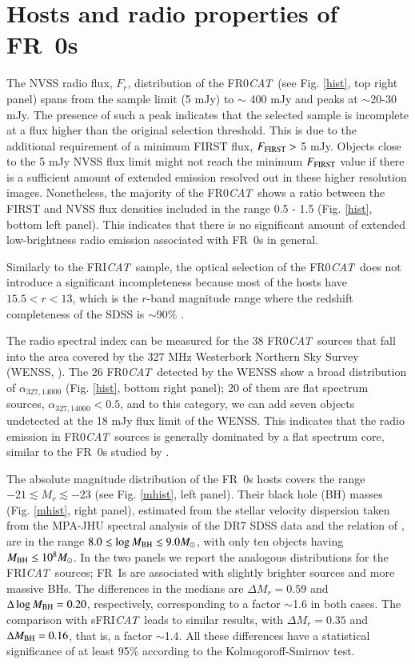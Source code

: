 \documentclass[traditabstract]{aa}
\newcommand{\FR}{FRI{\sl{CAT}}}\newcommand{\FRII}{FRII{\sl{CAT}}}
\newcommand{\FRo}{FR0{\sl{CAT}}}
\newcommand{\sFR}{sFRI{\sl{CAT}}}
\begin{document}
\section{Hosts and radio properties of FR~0s}
\label{hosts}

The NVSS radio flux, $F_r$, distribution of the \FRo\ (see
  Fig. \ref{hist}, top right panel) spans from the sample limit (5 mJy) to
  $\sim$ 400 mJy and peaks at $\sim$20-30 mJy. The presence of such a peak
  indicates that the selected sample is incomplete at a flux higher than the
  original selection threshold. This is due to the additional requirement of a
  minimum FIRST flux, $F_{\rm FIRST} >$ 5 mJy. Objects close to the 5 mJy NVSS
  flux limit might not reach the minimum $F_{\rm FIRST}$ value if there is a
  sufficient amount of extended emission resolved out in these higher
  resolution images. Nonetheless, the majority of the \FRo\ shows a ratio
between the FIRST and NVSS flux densities included in the range 0.5 - 1.5
(Fig. \ref{hist}, bottom left panel). This indicates that
  there is no significant amount of extended low-brightness radio emission
  associated with FR~0s in general.


Similarly to the \FR\ sample, the optical selection of the \FRo\ does
not introduce a significant incompleteness because most of the hosts
have $15.5 < r < 13$, which is the $r$-band magnitude range where the redshift
completeness of the SDSS is $\sim$90\% \citep{montero09}.

The radio spectral index can be measured for the 38 \FRo\ sources that
fall into the area covered by the 327 MHz Westerbork Northern Sky
Survey (WENSS, \citealt{rengelink97}). The 26 \FRo\ detected by the
WENSS show a broad distribution of $\alpha_{327,14000}$
(Fig. \ref{hist}, bottom right panel); 20 of them are flat spectrum
sources, $\alpha_{327,14000} < 0.5$, and to this category, we can add
seven objects undetected at the 18 mJy flux limit of the WENSS. This
indicates that the radio emission in \FRo\ sources is generally
dominated by a flat spectrum core, similar to the FR~0s studied by
\citet{baldi15}.

The absolute magnitude distribution of the FR~0s hosts covers the range
$-21 \lesssim M_r \lesssim -23$ (see Fig. \ref{mhist}, left panel). Their
black hole (BH) masses (Fig. \ref{mhist}, right panel), estimated from the
stellar velocity dispersion taken from the MPA-JHU spectral analysis of
  the DR7 SDSS data and the relation of \citet{tremaine02}, are in the range
$8.0 \lesssim \log M_{\rm BH} \lesssim 9.0 M_\odot$, with only ten objects
having $M_{\rm BH} \leq 10^8 M_\odot$. In the two panels we report the analogous
distributions for the \FR\ sources; FR~Is are associated with slightly
brighter sources and more massive BHs. The differences in the medians are
$\Delta M_r = 0.59$ and $\Delta \log M_{\rm BH} =0.20$, respectively,
corresponding to a factor $\sim$1.6 in both cases. The comparison with
\sFR\ leads to similar results, with $\Delta M_r = 0.35$ and $\Delta M_{\rm
  BH} =0.16$, that is, a factor $\sim$1.4. All these differences have a
statistical significance of at least 95\% according to the Kolmogoroff-Smirnov
test.
\end{document}
